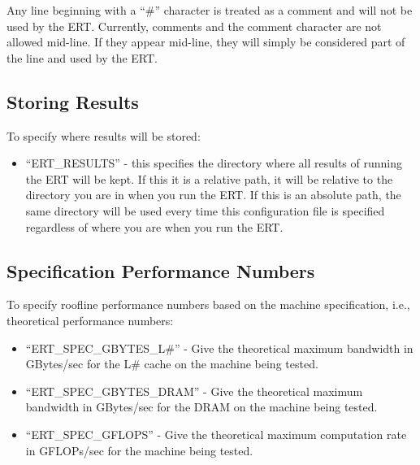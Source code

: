 Any line beginning with a ``\#'' character is treated as a comment and will not
be used by the ERT.  Currently, comments and the comment character are not
allowed mid-line.  If they appear mid-line, they will simply be considered
part of the line and used by the ERT.

\subsection{Storing Results}
To specify where results will be stored:

\begin{itemize}

\vspace{-0.1in}
\item{``ERT\_\+RESULTS'' - this specifies the directory where all results of
running the ERT will be kept.  If this it is a relative path, it will be
relative to the directory you are in when you run the ERT.  If this is an
absolute path, the same directory will be used every time this configuration
file is specified regardless of where you are when you run the ERT.}

\end{itemize}

\subsection{Specification Performance Numbers}
To specify roofline performance numbers based on the machine specification,
i.e., theoretical performance numbers:

\begin{itemize}

\vspace{-0.1in}
\item{``ERT\_\+SPEC\_\+GBYTES\_\+L\#'' - Give the theoretical maximum bandwidth in
GBytes/sec for the L\# cache on the machine being tested.}

\vspace{-0.1in}
\item{``ERT\_\+SPEC\_\+GBYTES\_\+DRAM'' - Give the theoretical maximum bandwidth in
GBytes/sec for the DRAM on the machine being tested.}

\vspace{-0.1in}
\item{``ERT\_\+SPEC\_\+GFLOPS'' - Give the theoretical maximum computation rate
in GFLOPs/sec for the machine being tested.}

\vspace{-0.1in}
\end{itemize}

